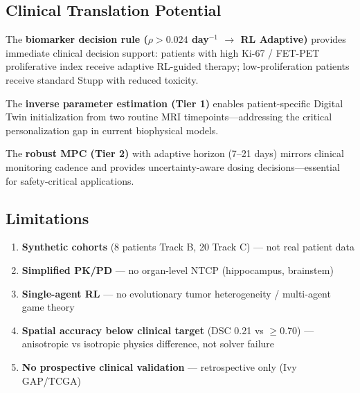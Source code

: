 \documentclass[11pt, twocolumn]{article}
\begin{document}
\subsection{Clinical Translation Potential}
The \textbf{biomarker decision rule ($\rho > 0.024$ day$^{-1}$ $\to$ RL Adaptive)} provides immediate clinical decision support: patients with high Ki-67 / FET-PET proliferative index receive adaptive RL-guided therapy; low-proliferation patients receive standard Stupp with reduced toxicity.

The \textbf{inverse parameter estimation (Tier 1)} enables patient-specific Digital Twin initialization from two routine MRI timepoints—addressing the critical personalization gap in current biophysical models.

The \textbf{robust MPC (Tier 2)} with adaptive horizon (7--21 days) mirrors clinical monitoring cadence and provides uncertainty-aware dosing decisions—essential for safety-critical applications.

\subsection{Limitations}
\begin{enumerate}
\item \textbf{Synthetic cohorts} (8 patients Track B, 20 Track C) — not real patient data
\item \textbf{Simplified PK/PD} — no organ-level NTCP (hippocampus, brainstem)
\item \textbf{Single-agent RL} — no evolutionary tumor heterogeneity / multi-agent game theory
\item \textbf{Spatial accuracy below clinical target} (DSC 0.21 vs $\geq$0.70) — anisotropic vs isotropic physics difference, not solver failure
\item \textbf{No prospective clinical validation} — retrospective only (Ivy GAP/TCGA)
\end{enumerate}
\end{document}
